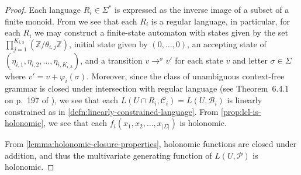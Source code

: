 \begin{proof}
	Each language $R_i \in \Sigma^*$ is expressed as the inverse image of a subset of a finite monoid.
	From \cite[Theorem~1]{rabin1959} we see that each $R_i$ is a regular language, in particular, for each $R_i$ we may construct a finite-state automaton with states given by the set $\prod_{j=1}^{K_{i,3}} (\mathbb{Z}/\theta_{i,j}\mathbb{Z})$, initial state given by $(0,\ldots,0)$, an accepting state of $(\eta_{i,1},\eta_{i,2},\ldots,\eta_{i,K_{i,3}})$, and a transition $v \to^\sigma v'$ for each state $v$ and letter $\sigma \in \Sigma$ where $v' = v + \varphi_i(\sigma)$.
	Moreover, since the class of unambiguous context-free grammar is closed under intersection with regular language (see Theorem~6.4.1 on p.~197 of \cite{harrison1978}), we see that each $L(U \cap R_i,\mathcal{C}_i) = L(U,\mathcal{B}_i)$ is linearly constrained as in \cref{defn:linearly-constrained-language}.
	From \cref{prop:lcl-is-holonomic}, we see that each $f_i(x_1,x_2,\ldots,x_{|\Sigma|})$ is holonomic.
	
	From \cref{lemma:holonomic-closure-properties}, holonomic functions are closed under addition, and thus the multivariate generating function of $L(U, \mathcal{P})$ is holonomic.
\end{proof}
